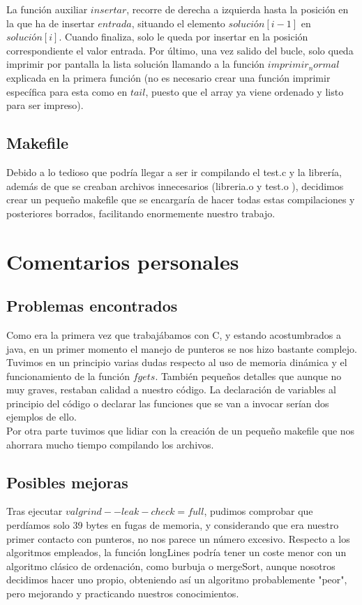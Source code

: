 La función auxiliar $insertar$, recorre de derecha a izquierda hasta la posición en la que ha de insertar $entrada$, situando el elemento $solución[i-1]$ en $solución[i]$. Cuando finaliza, solo le queda por insertar en la posición correspondiente el valor entrada.
Por último, una vez salido del bucle, solo queda imprimir por pantalla la lista solución llamando a la función $imprimir_normal$ explicada en la primera función (no es necesario crear una función imprimir específica para esta como en $tail$, puesto que el array ya viene ordenado y listo para ser impreso).
\section{Makefile}
Debido a lo tedioso que podría llegar a ser ir compilando el test.c y la librería, además de que se creaban archivos innecesarios (libreria.o y test.o ), decidimos crear un pequeño makefile que se encargaría de hacer todas estas compilaciones y posteriores borrados, facilitando enormemente nuestro trabajo.
\chapter{Comentarios personales}
\section{Problemas encontrados}
Como era la primera vez que trabajábamos con C, y estando acostumbrados a java, en un primer momento el manejo de punteros se nos hizo bastante complejo. Tuvimos en un principio varias dudas respecto al uso de memoria dinámica y el funcionamiento de la función $fgets$.
También pequeños detalles que aunque no muy graves, restaban calidad a nuestro código. La declaración de variables al principio del código o declarar las funciones que se van a invocar serían dos ejemplos de ello. \\
Por otra parte tuvimos que lidiar con la creación de un pequeño makefile que nos ahorrara mucho tiempo compilando los archivos.
\section{Posibles mejoras}
Tras ejecutar $valgrind --leak-check=full$, pudimos comprobar que perdíamos solo 39 bytes en fugas de memoria, y considerando que era nuestro primer contacto con punteros, no nos parece un número excesivo. Respecto a los algoritmos empleados, la función longLines podría tener un coste menor con un algoritmo clásico de ordenación, como burbuja o mergeSort, aunque nosotros decidimos hacer uno propio, obteniendo así un algoritmo probablemente "peor", pero mejorando y practicando nuestros conocimientos.
